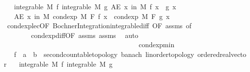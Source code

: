 \begin{isabellebody}
\ \ \ {\isachardoublequoteopen}integrable\ M\ f{\isachardoublequoteclose}\ {\isachardoublequoteopen}integrable\ M\ g{\isachardoublequoteclose}\ {\isachardoublequoteopen}AE\ x\ in\ M{\isachardot}{\kern0pt}\ f\ x\ {\isasymle}\ g\ x{\isachardoublequoteclose}\isanewline
\ \ \ {\isachardoublequoteopen}AE\ x\ in\ M{\isachardot}{\kern0pt}\ cond{\isacharunderscore}{\kern0pt}exp\ M\ F\ f\ x\ {\isasymle}\ cond{\isacharunderscore}{\kern0pt}exp\ M\ F\ g\ x{\isachardoublequoteclose}\isanewline
%
\isadelimproof
\ \ %
\endisadelimproof
%
\isatagproof
{}\isamarkupfalse%
\ cond{\isacharunderscore}{\kern0pt}exp{\isacharunderscore}{\kern0pt}le{\isacharunderscore}{\kern0pt}c{\isacharbrackleft}{\kern0pt}OF\ Bochner{\isacharunderscore}{\kern0pt}Integration{\isachardot}{\kern0pt}integrable{\isacharunderscore}{\kern0pt}diff{\isacharcomma}{\kern0pt}\ OF\ assms{\isacharparenleft}{\kern0pt}{}{\isacharcomma}{\kern0pt}{}{\isacharparenright}{\kern0pt}{\isacharcomma}{\kern0pt}\ of\ {}{\isacharbrackright}{\kern0pt}\ \isanewline
\ \ \ \ \ \ \ \ cond{\isacharunderscore}{\kern0pt}exp{\isacharunderscore}{\kern0pt}diff{\isacharbrackleft}{\kern0pt}OF\ assms{\isacharparenleft}{\kern0pt}{}{\isacharcomma}{\kern0pt}{}{\isacharparenright}{\kern0pt}{\isacharbrackright}{\kern0pt}\ assms{\isacharparenleft}{\kern0pt}{}{\isacharparenright}{\kern0pt}\ \isamarkupfalse%
\ auto%
\endisatagproof
{\isafoldproof}%
%
\isadelimproof
\isanewline
%
\endisadelimproof
\ \ \ \ \ \ \ \ \ \ \ \ \ \ \ \ \ \ \ \ \ \ \ \ \ \ \ \ \ \ \ \ \ \ \ \ \ \ \isanewline
{}\isamarkupfalse%
\ cond{\isacharunderscore}{\kern0pt}exp{\isacharunderscore}{\kern0pt}min{\isacharcolon}{\kern0pt}\isanewline
\ \ \ f\ {\isacharcolon}{\kern0pt}{\isacharcolon}{\kern0pt}\ {\isachardoublequoteopen}{\isacharprime}{\kern0pt}a\ {\isasymRightarrow}\ {\isacharprime}{\kern0pt}b\ {\isacharcolon}{\kern0pt}{\isacharcolon}{\kern0pt}\ {\isacharbraceleft}{\kern0pt}second{\isacharunderscore}{\kern0pt}countable{\isacharunderscore}{\kern0pt}topology{\isacharcomma}{\kern0pt}\ banach{\isacharcomma}{\kern0pt}\ linorder{\isacharunderscore}{\kern0pt}topology{\isacharcomma}{\kern0pt}\ ordered{\isacharunderscore}{\kern0pt}real{\isacharunderscore}{\kern0pt}vector{\isacharbraceright}{\kern0pt}{\isachardoublequoteclose}\isanewline
\ \ \ {\isachardoublequoteopen}integrable\ M\ f{\isachardoublequoteclose}\ {\isachardoublequoteopen}integrable\ M\ g{\isachardoublequoteclose}\isanewline

\end{isabellebody}

